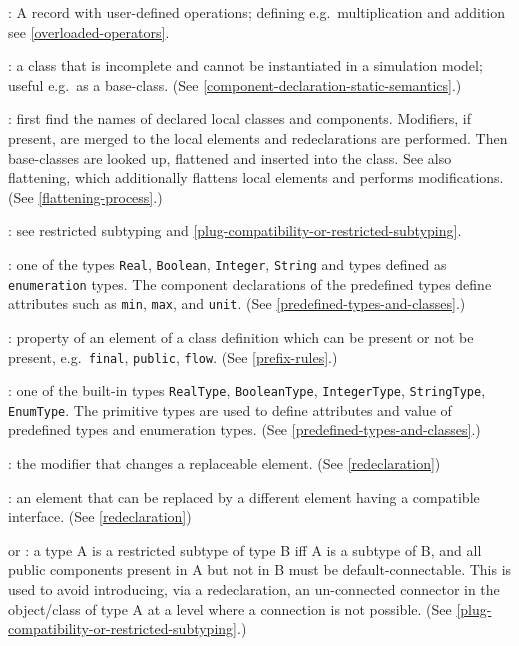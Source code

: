 : A record with user-defined operations;
defining e.g.\ multiplication and addition see \cref{overloaded-operators}.

: a class that is incomplete and cannot be instantiated
in a simulation model; useful e.g.\ as a base-class. (See \cref{component-declaration-static-semantics}.)

: first find the names of declared local
classes and components. Modifiers, if present, are merged to the local
elements and redeclarations are performed. Then base-classes are looked
up, flattened and inserted into the class. See also flattening, which
additionally flattens local elements and performs modifications. (See
\cref{flattening-process}.)

: see restricted subtyping and \cref{plug-compatibility-or-restricted-subtyping}.

: one of the types \lstinline!Real!, \lstinline!Boolean!, \lstinline!Integer!,
\lstinline!String! and types defined as \lstinline!enumeration! types. The component
declarations of the predefined types define attributes such as \lstinline!min!, \lstinline!max!,
and \lstinline!unit!. (See \cref{predefined-types-and-classes}.)

: property of an element of a class definition which can
be present or not be present, e.g.\ \lstinline!final!, \lstinline!public!, \lstinline!flow!. (See \cref{prefix-rules}.)

: one of the built-in types \lstinline!RealType!,
\lstinline!BooleanType!, \lstinline!IntegerType!, \lstinline!StringType!, \lstinline!EnumType!. The primitive types are
used to define attributes and value of predefined types and enumeration
types. (See \cref{predefined-types-and-classes}.)

: the modifier that changes a replaceable element.
(See \cref{redeclaration})

: an element that can be replaced by a different
element having a compatible interface. (See \cref{redeclaration})

 or : a type A
is a restricted subtype of type B iff A is a subtype of B, and all
public components present in A but not in B must be default-connectable.
This is used to avoid introducing, via a redeclaration, an un-connected
connector in the object/class of type A at a level where a connection is
not possible. (See \cref{plug-compatibility-or-restricted-subtyping}.)

